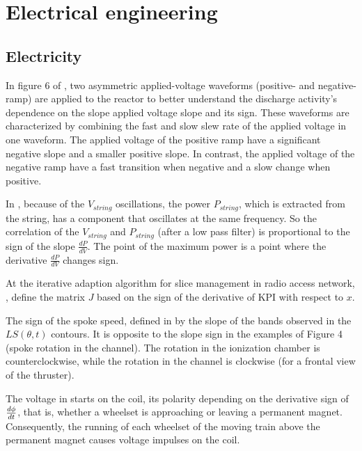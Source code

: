 \documentclass[11pt]{book}
\begin{document}
\section{Electrical engineering}


\subsection{Electricity}

In figure 6 of \cite{abdelaziz2015influence}, two asymmetric applied-voltage
waveforms (positive- and negative- ramp) are applied to the reactor
to better understand the discharge activity's dependence on the slope
applied voltage slope and its sign. These waveforms are characterized
by combining the fast and slow slew rate of the applied voltage in
one waveform. The applied voltage of the positive ramp have a significant
negative slope and a smaller positive slope. In contrast, the applied
voltage of the negative ramp have a fast transition when negative
and a slow change when positive.

In \cite{kustanovich2018synchronverter}, because of the $V_{string}$
oscillations, the power $P_{string}$, which is extracted from the
string, has a component that oscillates at the same frequency. So
the correlation of the $V_{string}$ and $P_{string}$ (after a low
pass filter) is proportional to the sign of the slope $\frac{dP}{dV}$.
The point of the maximum power is a point where the derivative $\frac{dP}{dV}$
changes sign.

At the iterative adaption algorithm for slice management in radio access network, \cite{khodapanah2019slice}, define the matrix $J$ based on the sign of the derivative
of KPI with respect to $x$.

The sign of the spoke speed, defined in \cite{ortega2019influence}
by the slope of the bands observed in the $LS\left(\theta,t\right)$
contours. It is opposite to the slope sign in the examples of Figure
4 (spoke rotation in the channel). The rotation in the ionization
chamber is counterclockwise, while the rotation in the channel is
clockwise (for a frontal view of the thruster).

The voltage in \cite{sergeyev2019autonomous} starts on the coil,
its polarity depending on the derivative sign of $\frac{d\text{\ensuremath{\phi}}}{dt}$,
that is, whether a wheelset is approaching or leaving a permanent
magnet. Consequently, the running of each wheelset of the moving train
above the permanent magnet causes voltage impulses on the coil.
\end{document}
